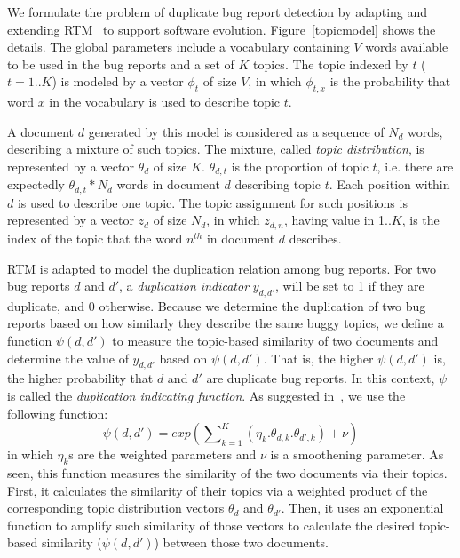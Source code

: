 
We formulate the problem of duplicate bug report detection by adapting
and extending RTM~\cite{RTM} to support software
evolution. Figure~\ref{topicmodel} shows the details.  The global
parameters include a vocabulary containing $V$ words available to be
used in the bug reports and a set of $K$ topics. The topic indexed by
$t$ ($t=1..K$) is modeled by a vector $\phi_t$ of size $V$, in which
$\phi_{t,x}$ is the probability that word $x$ in the vocabulary is
used to describe topic $t$.

A document $d$ generated by this model is considered as a sequence of
$N_d$ words, describing a mixture of such topics. The mixture, called
{\em topic distribution}, is represented by a vector $\theta_d$ of
size $K$. $\theta_{d,t}$ is the proportion of topic $t$, i.e. there
are expectedly $\theta_{d,t}*N_d$ words in document $d$ describing
topic $t$. Each position within $d$ is used to describe one topic. The
topic assignment for such positions is represented by a vector $z_d$
of size $N_d$, in which $z_{d,n}$, having value in 1..$K$, is the
index of the topic that the word $n^{th}$ in document $d$ describes.

\vspace{0.04in}
RTM is adapted to model the duplication relation among bug
reports. For two bug reports $d$ and $d'$, a {\em duplication
indicator} $y_{d,d'}$, will be set to 1 if they are duplicate, and 0
otherwise. Because we determine the duplication of two bug reports
based on how similarly they describe the same buggy topics, we define
a function $\psi(d,d')$ to measure the topic-based similarity of two
documents and determine the value of $y_{d,d'}$ based on
$\psi(d,d')$. That is, the higher $\psi(d,d')$ is, the higher
probability that $d$ and $d'$ are duplicate bug reports. In this
context, $\psi$ is called the {\em duplication indicating
function}. As suggested in~\cite{RTM}, we use the following function:
$$\psi(d, d') = exp({\sum\nolimits_{k=1}^K(\eta_k.\theta_{d,k}.\theta_{d',k})+
\nu})$$ in which $\eta_k$s are the weighted parameters and $\nu$ is a
smoothening parameter. As seen, this function measures the similarity of
the two documents via their topics. First, it calculates the
similarity of their topics via a weighted product of the corresponding
topic distribution vectors $\theta_d$ and $\theta_{d'}$. Then, it uses
an exponential function to amplify such similarity of those
vectors to calculate the desired topic-based similarity ($\psi(d,d')$)
between those two documents.

